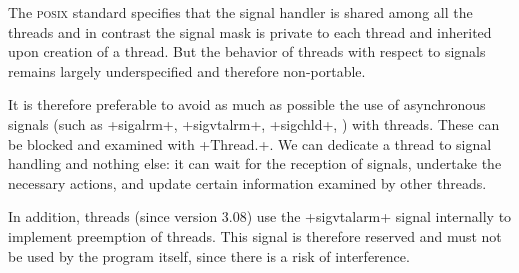 The \textsc{posix} standard specifies that the signal handler is
shared among all the threads and in contrast the signal mask is
private to each thread and inherited upon creation of a thread.  But
the behavior of threads with respect to signals remains largely
underspecified and therefore non-portable.

It is therefore preferable to avoid as much as possible the use of
asynchronous signals (such as \ml+sigalrm+, \ml+sigvtalrm+,
\ml+sigchld+, \etc) with threads. These can be blocked and examined
with \ml+Thread.+.  
We can dedicate a thread to signal
handling and nothing else: it can wait for the reception of signals,
undertake the necessary actions, and update certain information
examined by other threads.

In addition, {\ocaml} threads (since version 3.08) use the
\ml+sigvtalarm+ signal internally to implement preemption of threads.
This signal is therefore reserved and must not be used by the program
itself, since there is a risk of interference.







